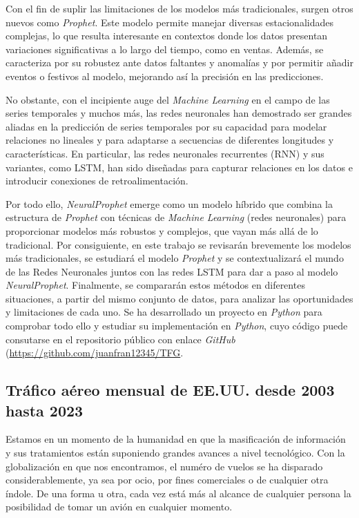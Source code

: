 \documentclass[12pt,twoside]{article}
\begin{document}
Con el fin de suplir las limitaciones de los modelos más tradicionales, surgen otros nuevos como \textit{Prophet}. Este modelo permite manejar diversas estacionalidades complejas, lo que resulta interesante en contextos donde los datos presentan variaciones significativas a lo largo del tiempo, como en ventas. Además, se caracteriza por su robustez ante datos faltantes y anomalías y por permitir añadir eventos o festivos al modelo, mejorando así la precisión en las predicciones. 

No obstante, con el incipiente auge del \textit{Machine Learning} en el campo de las series temporales y muchos más, las redes neuronales han demostrado ser grandes aliadas en la predicción de series temporales por su capacidad para modelar relaciones no lineales y para adaptarse a secuencias de diferentes longitudes y características. En particular, las redes neuronales recurrentes (RNN) y sus variantes, como LSTM, han sido diseñadas para capturar relaciones en los datos e introducir conexiones de retroalimentación.

Por todo ello, \textit{NeuralProphet} emerge como un modelo híbrido que combina la estructura de \textit{Prophet} con técnicas de \textit{Machine Learning} (redes neuronales) para proporcionar modelos más robustos y complejos, que vayan más allá de lo tradicional. Por consiguiente, en este trabajo se revisarán brevemente los modelos más tradicionales, se estudiará el modelo \textit{Prophet} y se contextualizará el mundo de las Redes Neuronales juntos con las redes LSTM para dar a paso al modelo \textit{NeuralProphet}. Finalmente, se compararán estos métodos en diferentes situaciones, a partir del mismo conjunto de datos, para analizar las oportunidades y limitaciones de cada uno. Se ha desarrollado un proyecto en \textit{Python} para comprobar todo ello y estudiar su implementación en \textit{Python},  cuyo código puede consutarse en el repositorio público con enlace \textit{GitHub} (\url{https://github.com/juanfran12345/TFG}.

\subsection{Tráfico aéreo mensual de EE.UU. desde 2003 hasta 2023} \label{sec:2}

Estamos en un momento de la humanidad en que la masificación de información y sus tratamientos están suponiendo grandes avances a nivel tecnológico. Con la globalización en que nos encontramos, el numéro de vuelos se ha disparado considerablemente, ya sea por ocio, por fines comerciales o de cualquier otra índole. De una forma u otra, cada vez está más al alcance de cualquier persona la posibilidad de tomar un avión en cualquier momento. 
\end{document}
